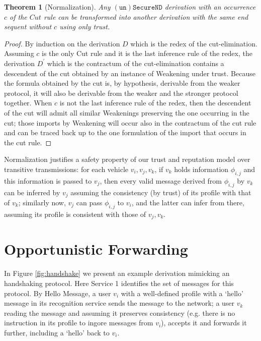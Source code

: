 \documentclass[compsoc, conference, letterpaper, 10pt, times]{IEEEtran}
\newtheorem{theorem}{Theorem}
\begin{document}

\begin{theorem}[Normalization]
Any $\mathtt{(un)SecureND}$ derivation with an occurrence $c$ of the $Cut$ rule can be transformed into another derivation with the same end sequent without $c$ using only trust.
\end{theorem}

\begin{proof}
	By induction on the derivation $D$ which is the redex of the cut-elimination. Assuming $c$ is the only Cut rule and it is the last inference rule of the redex, the derivation $D^\prime$ which is the contractum of the cut-elimination contains a descendent of the cut obtained by an instance of Weakening under trust. Because the formula obtained by the cut is, by hypothesis, derivable from the weaker protocol, it will also be derivable from the weaker and the stronger protocol together. When $c$ is not the last inference rule of the redex, then the descendent of the cut will admit all similar Weakenings preserving the one occurring in the cut; those imports by Weakening will occur also in the contractum of the cut rule and can be traced back up to the one formulation of the import that occurs in the cut rule.
\end{proof}

Normalization justifies a safety property of our trust and reputation model over transitive transmissions: for each vehicle $v_{i}, v_{j}, v_{k}$, if $v_{k}$ holds information $\phi_{i,j}$ and this information is passed to $v_{j}$, then every valid message derived from $\phi_{i,j}$ by $v_{k}$ can be inferred by $v_{j}$ assuming the consistency (by trust) of its profile with that of $v_{k}$; similarly now, $v_{j}$ can pass $\phi_{i,j}$ to $v_{i}$, and the latter can infer from there, assuming its profile is consistent with those of $v_{j}, v_{k}$.



\section{Opportunistic Forwarding}\label{sec:opportunistic}


In Figure \ref{fig:handshake} we present an example derivation mimicking an handshaking protocol. Here Service 1 identifies the set of messages for this protocol. By Hello Message, a user $v_{i}$ with a well-defined profile with a `hello' message in its recognition service sends the message to the network;   a user $v_{k}$ reading the message and assuming it preserves consistency (e.g. there is no instruction in its profile to ingore messages from $v_{i}$), accepts it and forwards it further, including a `hello' back to $v_{i}$.
\end{document}
